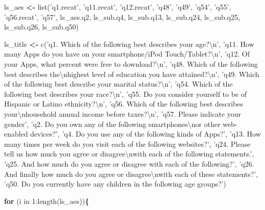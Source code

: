 \documentclass[]{article}
\newenvironment{Shaded}{\begin{snugshade}}{\end{snugshade}}
\newcommand{\KeywordTok}[1]{\textcolor[rgb]{0.13,0.29,0.53}{\textbf{{#1}}}}
\newcommand{\DecValTok}[1]{\textcolor[rgb]{0.00,0.00,0.81}{{#1}}}
\newcommand{\StringTok}[1]{\textcolor[rgb]{0.31,0.60,0.02}{{#1}}}
\newcommand{\NormalTok}[1]{{#1}}
\begin{document}
\begin{Shaded}
\begin{Highlighting}[]
{\NormalTok{ls_aes }\KeywordTok{<-} \NormalTok{list(}\StringTok{'q1.recat'}\NormalTok{, }\StringTok{'q11.recat'}\NormalTok{, }\StringTok{'q12.recat'}\NormalTok{, }\StringTok{'q48'}\NormalTok{, }\StringTok{'q49'}\NormalTok{, }\StringTok{'q54'}\NormalTok{, }\StringTok{'q55'}\NormalTok{, }\StringTok{'q56.recat'}\NormalTok{, }\StringTok{'q57'}\NormalTok{,}
               \NormalTok{ls_aes.q2, ls_sub.q4, ls_sub.q13, ls_sub.q24, ls_sub.q25, ls_sub.q26, ls_sub.q50) }

\NormalTok{ls_title }\KeywordTok{<-} \NormalTok{c(}\StringTok{'q1. Which of the following best describes your age?\textbackslash{}n'}\NormalTok{,}
              \StringTok{'q11. How many Apps do you have on your smartphone/iPod Touch/Tablet?\textbackslash{}n'}\NormalTok{,}
              \StringTok{'q12. Of your Apps, what percent were free to download?\textbackslash{}n'}\NormalTok{,}
              \StringTok{'q48. Which of the following best describes the\textbackslash{}nhighest level of education you have attained?\textbackslash{}n'}\NormalTok{,}
              \StringTok{'q49. Which of the following best describe your marital status?\textbackslash{}n'}\NormalTok{,}
              \StringTok{'q54. Which of the following best describes your race?\textbackslash{}n'}\NormalTok{,}
              \StringTok{'q55. Do you consider yourself to be of Hispanic or Latino ethnicity?\textbackslash{}n'}\NormalTok{,}
              \StringTok{'q56. Which of the following best describes your\textbackslash{}nhousehold annual income before taxes?\textbackslash{}n'}\NormalTok{,}
              \StringTok{'q57. Please indicate your gender'}\NormalTok{,}
              \StringTok{'q2. Do you own any of the following smartphones\textbackslash{}nor other web-enabled devices?'}\NormalTok{,}
              \StringTok{'q4. Do you use any of the following kinds of Apps?'}\NormalTok{,}
              \StringTok{'q13. How many times per week do you visit each of the following websites?'}\NormalTok{,}
              \StringTok{'q24. Please tell us how much you agree or disagree\textbackslash{}nwith each of the following statements.'}\NormalTok{,}
              \StringTok{'q25. And how much do you agree or disagree with each of the following?'}\NormalTok{,}
              \StringTok{'q26. And finally how much do you agree or disagree\textbackslash{}nwith each of these statements?'}\NormalTok{,}
              \StringTok{'q50. Do you currently have any children in the following age groups?'}\NormalTok{)}

\KeywordTok{for} \NormalTok{(i in }\DecValTok{1}\NormalTok{:length(ls_aes))}\KeywordTok{\{}
  
}
\end{Highlighting}
\end{Shaded}
\end{document}
